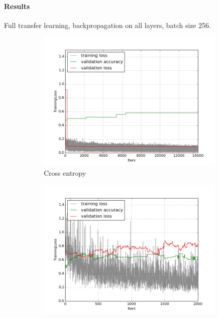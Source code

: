 \documentclass[a4paper,11pt]{article}
\begin{document}
\paragraph{Results}

Full transfer learning, backpropagation on all layers, batch size 256. \\

\begin{figure}
    \centering
    \begin{minipage}[b]{\textwidth}
      \begin{subfigure}{.5\textwidth} 
        \centering
        \includegraphics[scale=0.4]{images/plot_clampdetCI98_none_bs256_lr5(copy).png}
        \caption{Cross entropy}\label{fig:2a}
      \end{subfigure}%
      \begin{subfigure}{.5\textwidth} 
        \centering
        \includegraphics[scale=0.4]{images/plot_clampdetCI98_none_bs256_lr5_sbl.png}

\end{subfigure}
\end{minipage}
\end{figure}
\end{document}
